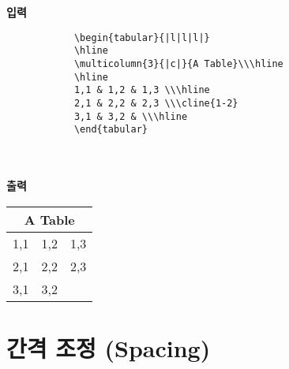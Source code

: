 	
	\singlespacing
	\textbf{입력}\\
		\begin{boxedminipage}[t]{1.0\linewidth}
		\small
		\begin{verbatim}
			\begin{tabular}{|l|l|l|}
			\hline
			\multicolumn{3}{|c|}{A Table}\\\hline
			\hline
			1,1 & 1,2 & 1,3 \\\hline
			2,1 & 2,2 & 2,3 \\\cline{1-2}
			3,1 & 3,2 & \\\hline
			\end{tabular}
		\end{verbatim} 
		\end{boxedminipage} \\ \\
			
	\textbf{출력}\\
	
		\begin{tabular}{|l|l|l|}
		\hline
		\multicolumn{3}{|c|}{A Table}\\\hline
		\hline
		1,1 & 1,2 & 1,3 \\\hline
		2,1 & 2,2 & 2,3 \\\cline{1-2}
		3,1 & 3,2 & \\\hline
		\end{tabular}

	\doublespacing





\clearpage
\section{간격 조정 (Spacing)}
\null
	
	
